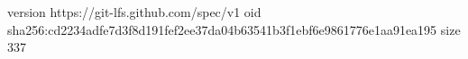 version https://git-lfs.github.com/spec/v1
oid sha256:cd2234adfe7d3f8d191fef2ee37da04b63541b3f1ebf6e9861776e1aa91ea195
size 337

